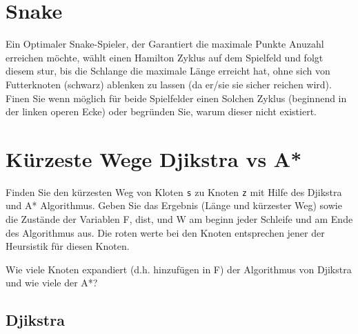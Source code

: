 \documentclass[a4paper,11pt]{report}
\begin{document}
\chapter{Snake}

Ein Optimaler Snake-Spieler, der Garantiert die maximale Punkte Anuzahl erreichen möchte, wählt einen Hamilton Zyklus auf dem Spielfeld und folgt diesem stur, bis die Schlange die maximale Länge erreicht hat, ohne sich von Futterknoten (schwarz) ablenken zu lassen (da er/sie sie sicher reichen wird).
Finen Sie wenn möglich für beide Spielfelder einen Solchen Zyklus (beginnend in der linken operen Ecke) oder begründen Sie, warum dieser nicht existiert.

\newpage

\chapter{Kürzeste Wege Djikstra vs A*}

Finden Sie den kürzesten Weg von Kloten \texttt{s} zu Knoten \texttt{z} mit Hilfe des Djikstra und A* Algorithmus.
Geben Sie das Ergebnis (Länge und kürzester Weg) sowie die Zustände der Variablen F, dist, und W am beginn jeder Schleife und am Ende des Algorithmus aus.
Die roten werte bei den Knoten entsprechen jener der Heursistik für diesen Knoten.

Wie viele Knoten expandiert (d.h. hinzufügen in F) der Algorithmus von Djikstra und wie viele der A*?

\section{Djikstra}\label{sec:djikstra}
\end{document}
